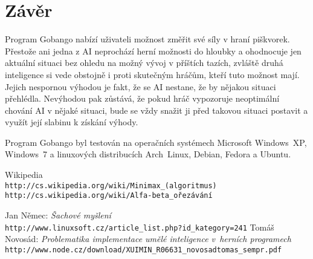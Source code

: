 \documentclass[a4paper,11pt,titlepage]{article}
\begin{document}


\section{Závěr}
Program Gobango nabízí uživateli možnost změřit své síly v hraní piškvorek. Přestože ani jedna z AI neprochází herní možnosti do hloubky a ohodnocuje jen aktuální situaci bez ohledu na možný vývoj v příštích tazích, zvláště druhá inteligence si vede obstojně i proti skutečným hráčům, kteří tuto možnost mají. Jejich nespornou výhodou je fakt, že se AI nestane, že by nějakou situaci přehlédla. Nevýhodou pak zůstává, že pokud hráč vypozoruje neoptimální chování AI v nějaké situaci, bude se vždy snažit ji před takovou situaci postavit a využít její slabinu k získání výhody.

Program Gobango byl testován na operačních systémech Microsoft Windows~XP, Windows~7 a linuxových distribucích Arch~Linux, Debian, Fedora a Ubuntu.

\newpage
\renewcommand{\refname}{Použité zdroje}
\begin{thebibliography}{goba}
 Wikipedia\\
  \small{\verb|http://cs.wikipedia.org/wiki/Minimax_(algoritmus)|}\\
  \small{\verb|http://cs.wikipedia.org/wiki/Alfa-beta_ořezávání|}

 Jan Němec:
  \emph{Šachové myšlení}\\
  \small{\verb|http://www.linuxsoft.cz/article_list.php?id_kategory=241|}
 Tomáš Novosád:
  \emph{Problematika implementace umělé inteligence v~herních programech}\\
  \small{\verb|http://www.node.cz/download/XUIMIN_R06631_novosadtomas_sempr.pdf|}
\end{thebibliography}
\end{document}
